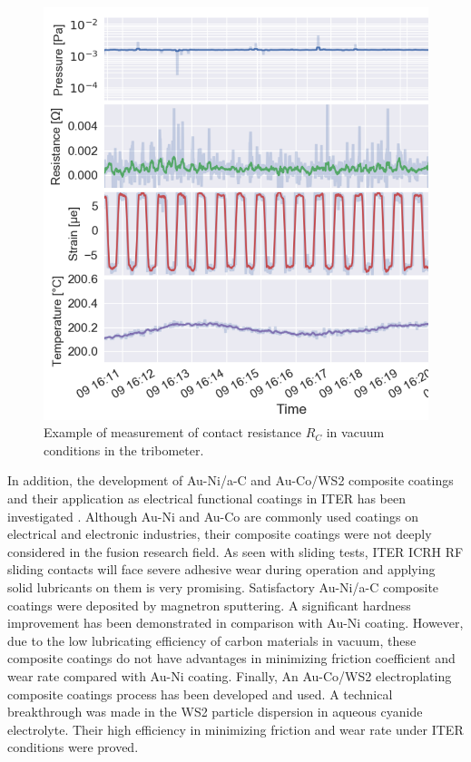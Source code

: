 {\begin{figure}[h]
	\centering
	\includegraphics[width=1.0\linewidth]{figures/chap3/RF_contacts/RF_contact_tribometer}
	\caption{Example of measurement of contact resistance $R_C$ in vacuum conditions in the tribometer. }
	\label{fig:rfcontacttribometerresults}
\end{figure}

In addition, the development of Au-Ni/a-C and Au-Co/WS2 composite coatings and their application as electrical functional coatings in ITER has been investigated . Although Au-Ni and Au-Co are commonly used coatings on electrical and electronic industries, their composite coatings were not deeply considered in the fusion research field. As seen with sliding tests, ITER ICRH RF sliding contacts will face severe adhesive wear during operation and applying solid lubricants on them is very promising. Satisfactory Au-Ni/a-C composite coatings were deposited by magnetron sputtering. A significant hardness improvement has been demonstrated in comparison with Au-Ni coating. However, due to the low lubricating efficiency of carbon materials in vacuum, these composite coatings do not have advantages in minimizing friction coefficient and wear rate compared with Au-Ni coating. Finally, An Au-Co/WS2 electroplating composite coatings process has been developed and used. A technical breakthrough was made in the WS2 particle dispersion in aqueous cyanide electrolyte\cite{chen2020}. Their high efficiency in minimizing friction and wear rate under ITER conditions were proved. 

}
